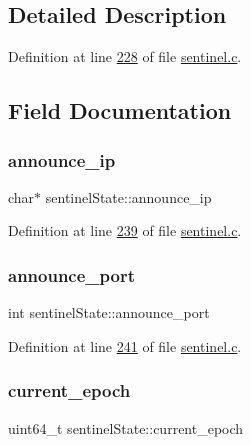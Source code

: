\subsection{Detailed Description}


Definition at line \hyperlink{sentinel_8c_source_l00228}{228} of file \hyperlink{sentinel_8c_source}{sentinel.\+c}.



\subsection{Field Documentation}
\mbox{\label{structsentinelState_ab20d4a190b32245c86cced580ff5b54f}} 
\subsubsection{\texorpdfstring{announce\+\_\+ip}{announce\_ip}}
{\footnotesize\ttfamily char$\ast$ sentinel\+State\+::announce\+\_\+ip}



Definition at line \hyperlink{sentinel_8c_source_l00239}{239} of file \hyperlink{sentinel_8c_source}{sentinel.\+c}.

\mbox{\label{structsentinelState_a0d18a9c093c809e1f429a52078913304}} 
\subsubsection{\texorpdfstring{announce\+\_\+port}{announce\_port}}
{\footnotesize\ttfamily int sentinel\+State\+::announce\+\_\+port}



Definition at line \hyperlink{sentinel_8c_source_l00241}{241} of file \hyperlink{sentinel_8c_source}{sentinel.\+c}.

\mbox{\label{structsentinelState_a4a0c5529c941f5b2f9908a6dd8a321bd}} 
\subsubsection{\texorpdfstring{current\+\_\+epoch}{current\_epoch}}
{\footnotesize\ttfamily uint64\+\_\+t sentinel\+State\+::current\+\_\+epoch}



